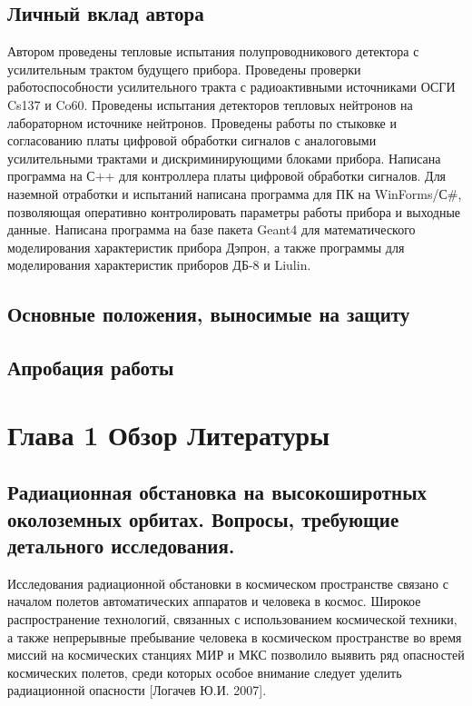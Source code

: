 \documentclass[a4paper,portrait,12pt]{article}
\begin{document}
{{{{\subsection*{\textbf{Личный вклад автора}}

Автором проведены тепловые испытания полупроводникового детектора с усилительным трактом будущего прибора. Проведены проверки работоспособности усилительного тракта с радиоактивными источниками ОСГИ Cs137 и Co60. Проведены испытания детекторов тепловых нейтронов на лабораторном источнике нейтронов. Проведены работы по стыковке и согласованию платы цифровой обработки сигналов с аналоговыми усилительными трактами и дискриминирующими блоками прибора. Написана программа на С++ для контроллера платы цифровой обработки сигналов. Для наземной отработки и испытаний написана программа для ПК на WinForms/С\#, позволяющая оперативно контролировать параметры работы прибора и выходные данные. Написана программа на базе пакета Geant4 для математического моделирования характеристик прибора Дэпрон, а также программы для моделирования характеристик приборов ДБ-8 и Liulin.





\subsection*{\textbf{Основные положения, выносимые на защиту}}

\subsection*{\textbf{Апробация работы}}










\newpage



\section*{\textbf{Глава 1 Обзор Литературы}}

\subsection*{	\textbf{Радиационная обстановка на высокоширотных околоземных орбитах. Вопросы, требующие детального исследования.}}

Исследования радиационной обстановки в космическом пространстве связано с началом полетов автоматических аппаратов и человека в космос.  Широкое распространение технологий, связанных с использованием космической техники, а также непрерывные пребывание человека в космическом пространстве во время миссий на космических станциях МИР и МКС позволило выявить ряд опасностей космических полетов, среди которых особое внимание следует уделить радиационной опасности [Логачев Ю.И. 2007].


}}}}
\end{document}
